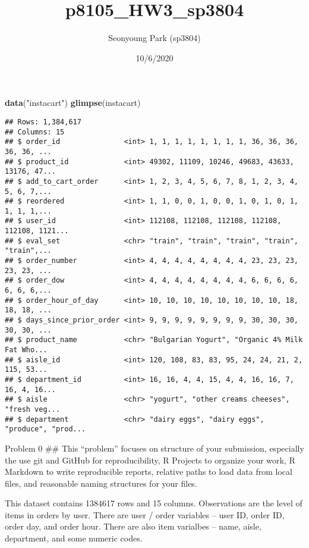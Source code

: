 \documentclass[]{article}
\title{p8105\_HW3\_sp3804}
\author{Seonyoung Park (sp3804)}
\date{10/6/2020}
\newenvironment{Shaded}{\begin{snugshade}}{\end{snugshade}}
\newcommand{\KeywordTok}[1]{\textcolor[rgb]{0.13,0.29,0.53}{\textbf{#1}}}
\newcommand{\NormalTok}[1]{#1}
\newcommand{\StringTok}[1]{\textcolor[rgb]{0.31,0.60,0.02}{#1}}
\begin{document}
\maketitle

\begin{Shaded}
\begin{Highlighting}[]
\KeywordTok{data}\NormalTok{(}\StringTok{"instacart"}\NormalTok{)}
\KeywordTok{glimpse}\NormalTok{(instacart)}
\end{Highlighting}
\end{Shaded}

\begin{verbatim}
## Rows: 1,384,617
## Columns: 15
## $ order_id               <int> 1, 1, 1, 1, 1, 1, 1, 1, 36, 36, 36, 36, 36, ...
## $ product_id             <int> 49302, 11109, 10246, 49683, 43633, 13176, 47...
## $ add_to_cart_order      <int> 1, 2, 3, 4, 5, 6, 7, 8, 1, 2, 3, 4, 5, 6, 7,...
## $ reordered              <int> 1, 1, 0, 0, 1, 0, 0, 1, 0, 1, 0, 1, 1, 1, 1,...
## $ user_id                <int> 112108, 112108, 112108, 112108, 112108, 1121...
## $ eval_set               <chr> "train", "train", "train", "train", "train",...
## $ order_number           <int> 4, 4, 4, 4, 4, 4, 4, 4, 23, 23, 23, 23, 23, ...
## $ order_dow              <int> 4, 4, 4, 4, 4, 4, 4, 4, 6, 6, 6, 6, 6, 6, 6,...
## $ order_hour_of_day      <int> 10, 10, 10, 10, 10, 10, 10, 10, 18, 18, 18, ...
## $ days_since_prior_order <int> 9, 9, 9, 9, 9, 9, 9, 9, 30, 30, 30, 30, 30, ...
## $ product_name           <chr> "Bulgarian Yogurt", "Organic 4% Milk Fat Who...
## $ aisle_id               <int> 120, 108, 83, 83, 95, 24, 24, 21, 2, 115, 53...
## $ department_id          <int> 16, 16, 4, 4, 15, 4, 4, 16, 16, 7, 16, 4, 16...
## $ aisle                  <chr> "yogurt", "other creams cheeses", "fresh veg...
## $ department             <chr> "dairy eggs", "dairy eggs", "produce", "prod...
\end{verbatim}

Problem 0 \#\# This ``problem'' focuses on structure of your submission,
especially the use git and GitHub for reproducibility, R Projects to
organize your work, R Markdown to write reproducible reports, relative
paths to load data from local files, and reasonable naming structures
for your files.

This dataset contains 1384617 rows and 15 columns. Observations are the
level of items in orders by user. There are user / order variables --
user ID, order ID, order day, and order hour. There are also item
varialbes -- name, aisle, department, and some numeric codes.
\end{document}
